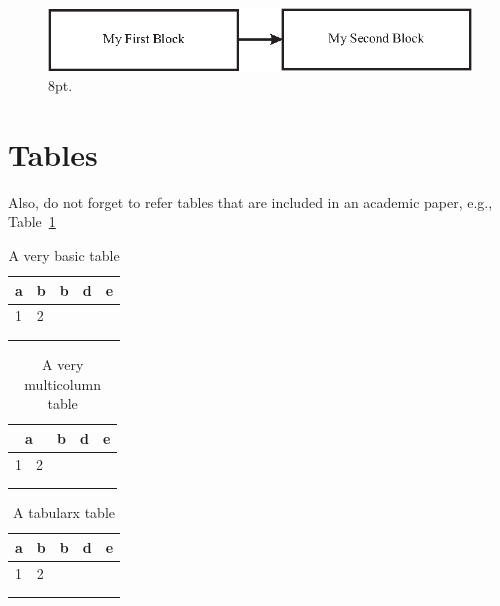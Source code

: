 \documentclass[lettersize,journal]{IEEEtran}
\begin{document}
    \begin{figure}
      \begin{center}{}
          \includegraphics[width=2\columnwidth,draft=false]{./figs/figure4.eps}
          \caption{8pt.}
          \label{fig:figurefull}
      \end{center}
    \end{figure}




\section{Tables}
\label{sec:tables}

Also, do not forget to refer tables that are included in an academic paper, e.g., Table~\ref{tab:basic}

\begin{table}[]
\centering
\caption{A very basic table}
\label{tab:basic}
\begin{tabular}{|l|l|l|l|l|}
\hline
a & b & b & d & e \\ \hline
1 & 2 &   &   &   \\ \hline
  &   &   &   &   \\ \hline
  &   &   &   &   \\ \hline
\end{tabular}
\end{table}

\begin{table}[]
\centering
\caption{A very multicolumn table}
\label{tab:multicolumn}
\begin{tabular}{|ll|l|l|l|}
\hline
\multicolumn{2}{|c|}{a}     & b & d & e \\ \hline
\multicolumn{1}{|l|}{1} & 2 &   &   &   \\ \hline
\multicolumn{1}{|l|}{}  &   &   &   &   \\ \hline
\multicolumn{1}{|l|}{}  &   &   &   &   \\ \hline
\end{tabular}
\end{table}

\begin{table}[]
\centering
\caption{A tabularx table}
\label{tab:tabularx}
\begin{tabularx}{\columnwidth}{|X|l|l|l|l|}
\hline
a & b & b & d & e \\ \hline
1 & 2 &   &   &   \\ \hline
  &   &   &   &   \\ \hline
  &   &   &   &   \\ \hline
\end{tabularx}
\end{table}
\end{document}
